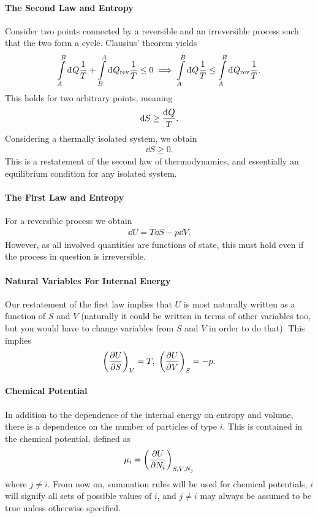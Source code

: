 \paragraph{The Second Law and Entropy}
Consider two points connected by a reversible and an irreversible process such that the two form a cycle. Clausius' theorem yields
\begin{align*}
	\intin{A}{B}{Q}{\frac{1}{T}} + \intin{B}{A}{Q_{\text{rev}}}{\frac{1}{T}} \leq 0 \implies \intin{A}{B}{Q}{\frac{1}{T}} \leq \intin{A}{B}{Q_{\text{rev}}}{\frac{1}{T}}.
\end{align*}
This holds for two arbitrary points, meaning
\begin{align*}
	\dd{S} \geq \frac{\din{Q}}{T}.
\end{align*}
Considering a thermally isolated system, we obtain
\begin{align*}
	\dd{S} \geq 0.
\end{align*}
This is a restatement of the second law of thermodynamics, and essentially an equilibrium condition for any isolated system.

\paragraph{The First Law and Entropy}
For a reversible process we obtain
\begin{align*}
	\dd{U} = T\dd{S} - p\dd{V}.
\end{align*}
However, as all involved quantities are functions of state, this must hold even if the process in question is irreversible.

\paragraph{Natural Variables For Internal Energy}
Our restatement of the first law implies that $U$ is most naturally written as a function of $S$ and $V$ (naturally it could be written in terms of other variables too, but you would have to change variables from $S$ and $V$ in order to do that). This implies
\begin{align*}
	\fix{\pdv{U}{S}}{V} = T,\ \fix{\pdv{U}{V}}{S} = -p.
\end{align*}

\paragraph{Chemical Potential}
In addition to the dependence of the internal energy on entropy and volume, there is a dependence on the number of particles of type $i$. This is contained in the chemical potential, defined as
\begin{align*}
	\mu_{i} = \fix{\pdv{U}{N_{i}}}{S, V, N_{j}}
\end{align*}
where $j \neq i$. From now on, summation rules will be used for chemical potentials, $i$ will signify all sets of possible values of $i$, and $j\neq i$ may always be assumed to be true unless otherwise specified.

